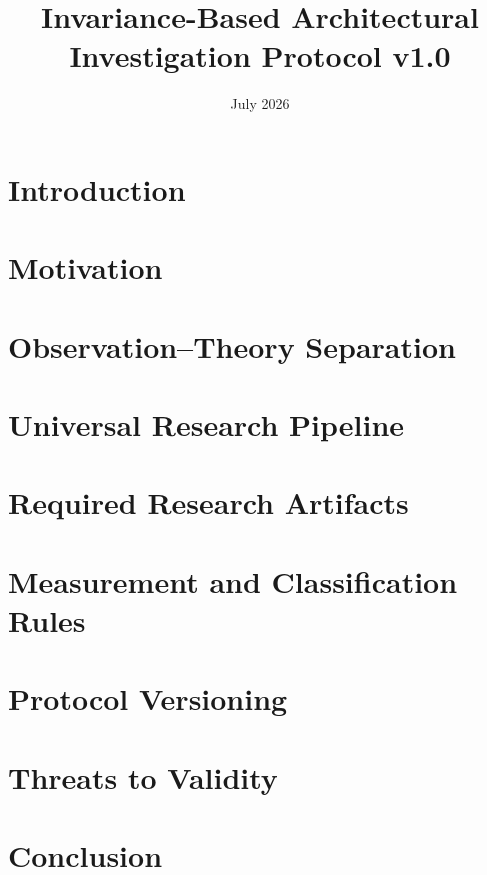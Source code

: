 \documentclass[11pt]{article}
\title{Invariance-Based Architectural Investigation Protocol v1.0}
\author{}
\date{July 2026}
\begin{document}
\maketitle

\begin{abstract}

\end{abstract}

\section{Introduction}


\section{Motivation}


\section{Observation--Theory Separation}


\section{Universal Research Pipeline}


\section{Required Research Artifacts}


\section{Measurement and Classification Rules}


\section{Protocol Versioning}


\section{Threats to Validity}


\section{Conclusion}




\end{document}
